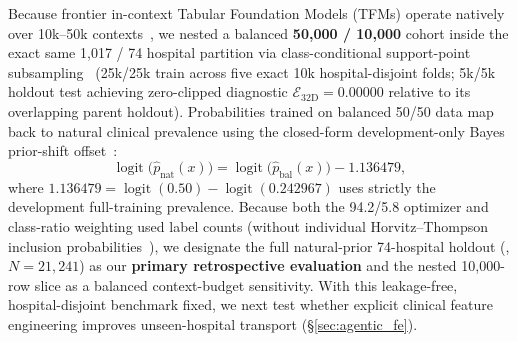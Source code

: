 Because frontier in-context Tabular Foundation Models (TFMs) operate natively over 10k--50k contexts~\cite{jaeger2026tabpfn35,qu2026kumotabular,kong2026tabfm}, we nested a balanced \textbf{50,000 / 10,000} cohort inside the exact same 1,017 / 74 hospital partition via class-conditional support-point subsampling~\cite{joseph2022split} (25k/25k train across five exact 10k hospital-disjoint folds; 5k/5k holdout test achieving zero-clipped diagnostic $\mathcal{E}_{32\mathrm{D}}=0.00000$ relative to its overlapping parent holdout). Probabilities trained on balanced 50/50 data map back to natural clinical prevalence using the closed-form development-only Bayes prior-shift offset~\cite{king2001logistic,saerens2002adjusting}:
\begin{equation}
  \operatorname{logit}\bigl(\hat{p}_{\mathrm{nat}}(x)\bigr) = \operatorname{logit}\bigl(\hat{p}_{\mathrm{bal}}(x)\bigr) - 1.136479,
  \label{eq:bayes_shift}
\end{equation}
where $1.136479 = \operatorname{logit}(0.50) - \operatorname{logit}(0.242967)$ uses strictly the development full-training prevalence. Because both the 94.2/5.8 optimizer and class-ratio weighting used label counts (without individual Horvitz--Thompson inclusion probabilities~\cite{horvitz1952generalization}), we designate the full natural-prior 74-hospital holdout (, $N=21{,}241$) as our \textbf{primary retrospective evaluation} and the nested 10,000-row slice as a balanced context-budget sensitivity. With this leakage-free, hospital-disjoint benchmark fixed, we next test whether explicit clinical feature engineering improves unseen-hospital transport (\S\ref{sec:agentic_fe}).
